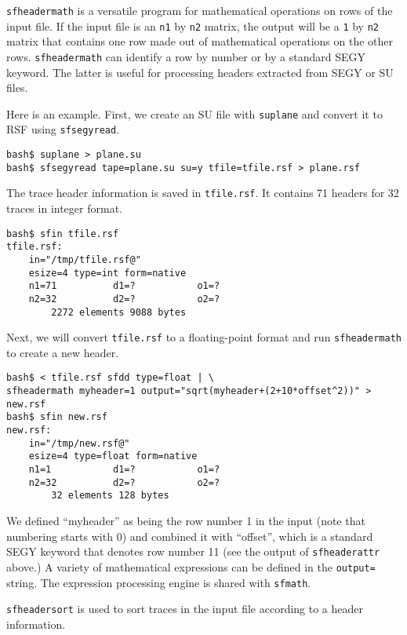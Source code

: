\noindent\doublebox{\parbox{\textwidth}{

}}

\texttt{sfheadermath} is a versatile program for mathematical
operations on rows of the input file. If the input file is an
\texttt{n1} by \texttt{n2} matrix, the output will be a \texttt{1} by
\texttt{n2} matrix that contains one row made out of mathematical
operations on the other rows. \texttt{sfheadermath} can identify a row
by number or by a standard SEGY keyword. The latter is useful for
processing headers extracted from SEGY or SU files.

Here is an example. First, we create an SU file with \texttt{suplane} and convert it to RSF using \texttt{sfsegyread}.
\begin{verbatim}
bash$ suplane > plane.su
bash$ sfsegyread tape=plane.su su=y tfile=tfile.rsf > plane.rsf
\end{verbatim}
The trace header information is saved in \texttt{tfile.rsf}. It
contains 71 headers for 32 traces in integer format.
\begin{verbatim}
bash$ sfin tfile.rsf
tfile.rsf:
    in="/tmp/tfile.rsf@"
    esize=4 type=int form=native
    n1=71          d1=?           o1=?
    n2=32          d2=?           o2=?
        2272 elements 9088 bytes
\end{verbatim}
Next, we will convert \texttt{tfile.rsf} to a floating-point format
and run \texttt{sfheadermath} to create a new header.
\begin{verbatim}
bash$ < tfile.rsf sfdd type=float | \
sfheadermath myheader=1 output="sqrt(myheader+(2+10*offset^2))" > new.rsf
bash$ sfin new.rsf
new.rsf:
    in="/tmp/new.rsf@"
    esize=4 type=float form=native
    n1=1           d1=?           o1=?
    n2=32          d2=?           o2=?
        32 elements 128 bytes
\end{verbatim}
We defined ``myheader'' as being the row number 1 in the input (note
that numbering starts with 0) and combined it with ``offset'', which
is a standard SEGY keyword that denotes row number 11 (see the output
of \texttt{sfheaderattr} above.) A variety of mathematical expressions
can be defined in the \texttt{output=} string. The expression
processing engine is shared with \texttt{sfmath}.

\noindent\doublebox{\parbox{\textwidth}{

}}

\texttt{sfheadersort} is used to sort traces in the input file
according to a header information. 

